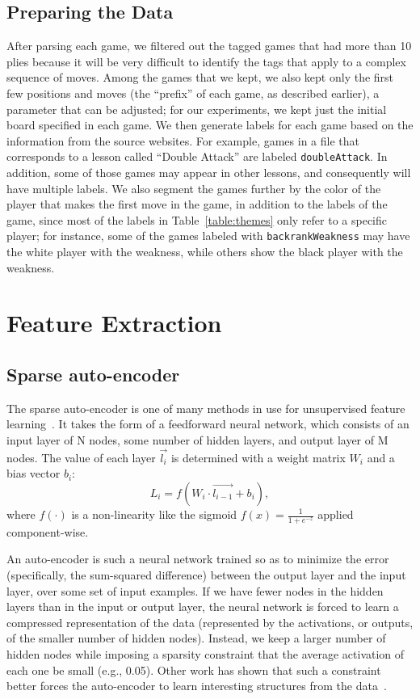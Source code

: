 \documentclass[11pt]{article}
\begin{document}
\subsection{Preparing the Data}
After parsing each game, we filtered out the tagged games that had more than 10 plies because it will be very difficult to identify the tags that apply to a complex sequence of moves. Among the games that we kept, we also kept only the first few positions and moves (the ``prefix'' of each game, as described earlier), a parameter that can be adjusted; for our experiments, we kept just the initial board specified in each game. We then generate labels for each game based on the information from the source websites. For example, games in a file that corresponds to a lesson called ``Double Attack'' are labeled {\tt doubleAttack}. In addition, some of those games may appear in other lessons, and consequently will have multiple labels. We also segment the games further by the color of the player that makes the first move in the game, in addition to the labels of the game, since most of the labels in Table~\ref{table:themes} only refer to a specific player; for instance, some of the games labeled with {\tt backrankWeakness} may have the white player with the weakness, while others show the black player with the weakness.

\section{Feature Extraction}
\subsection{Sparse auto-encoder}
The sparse auto-encoder is one of many methods in use for unsupervised feature learning~\cite{Coates}. It takes the form of a feedforward neural network, which consists of an input layer of N nodes, some number of hidden layers, and output layer of M nodes. The value of each layer $\vec{l_i}$ is determined with a weight matrix $W_i$ and a bias vector $b_i$: \[L_i = f(W_i \cdot \vec{l_{i-1}} + b_i),\] where $f(\cdot)$ is a non-linearity like the sigmoid $f(x) = \frac{1}{1 + e^{-z}}$ applied component-wise.

An auto-encoder is such a neural network trained so as to minimize the error (specifically, the sum-squared difference) between the output layer and the input layer, over some set of input examples. If we have fewer nodes in the hidden layers than in the input or output layer, the neural network is forced to learn a compressed representation of the data (represented by the activations, or outputs, of the smaller number of hidden nodes). Instead, we keep a larger number of hidden nodes while imposing a sparsity constraint that the average activation of each one be small (e.g., 0.05). Other work has shown that such a constraint better forces the auto-encoder to learn interesting structures from the data~\cite{bengio}.
\end{document}
